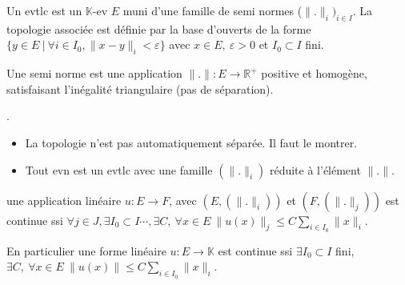 \begin{definition}
    Un evtlc est un $\mathbb{K}$-ev $E$ muni d'une famille de semi normes ($\|.\|_i)_{i\in I}$. La topologie associée est définie par la base d'ouverts de la forme $\{y\in E\ |\ \forall i\in I_0, \|x-y\|_i<\varepsilon \} $ avec $x\in E,\ \varepsilon >0$ et $I_0\subset I$ fini.
\end{definition}

\begin{remarque}
    Une semi norme est une application $\|.\|:E\to \mathbb{R}^+ $ positive et homogène, satisfaisant l'inégalité triangulaire (pas de séparation).
\end{remarque}

\begin{remarque}
    .\begin{itemize}
        \item La topologie n'est pas automatiquement séparée. Il faut le montrer.
    \item Tout evn est un evtlc avec une famille $(\|.\|_i)$ réduite à l'élément $\|.\|$.
\end{itemize}
\end{remarque}

\begin{proposition}
   une application linéaire $u:E\to F$, avec $(E, (\|.\|_i))$ et $(F,(\|.\|_j))$ est continue ssi $\forall j\in J, \exists I_0\subset I\cdots, \exists C,\ \forall x\in E\ \|u(x)\|_j\le C \sum\limits_{i\in I_0}^{} \|x\|_i$. \\
\end{proposition}

En particulier une forme linéaire $u:E\to \mathbb{K} $ est continue ssi $\exists I_0\subset I$ fini, $\exists C,\ \forall x\in E\ \|u(x)\|\le C \sum\limits_{i\in I_0}^{} \|x\|_i$.

